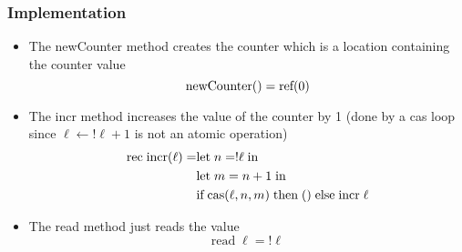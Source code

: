 \subsubsection{Implementation}
\begin{itemize}
	\item The newCounter method creates the counter which is a location containing the counter value
  \[
    \text{newCounter}() = \text{ref}(0)
  \]
  \item The incr method increases the value of the counter by 1 (done by a cas loop since $\ell \leftarrow !\ell + 1$ is not an atomic operation)
  \begin{align*}  
    \text{rec} \; \text{incr}(\ell) = &\text{let} \; n=!\ell \; \text{in} \\
                                 &\text{let} \; m = n+1 \; \text{in} \\
                                 &\text{if} \; \text{cas}(\ell, n,m) \; \text{then} \; () \; \text{else} \; \text{incr} \; \ell
  \end{align*}
  \item The read method just reads the value
  \[
    \text{read} \; \ell = !\ell
  \]
\end{itemize}

